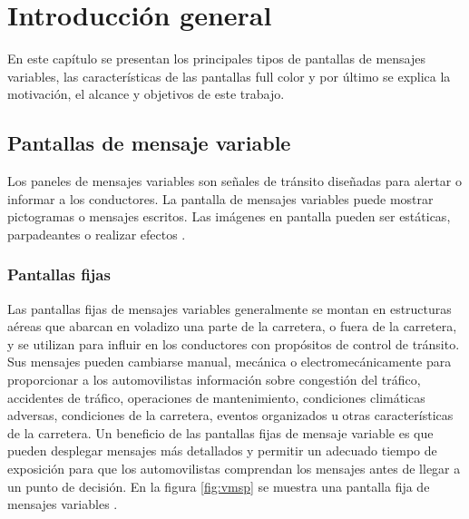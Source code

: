 
\chapter{Introducción general} %

\label{Chapter1} %
\label{IntroGeneral}
En este capítulo se presentan los principales tipos de pantallas de mensajes variables, las características de las pantallas full color y por último se explica la motivación, el alcance y objetivos de este trabajo.

\newcommand{\keyword}[1]{\textbf{#1}}
\newcommand{\tabhead}[1]{\textbf{#1}}
\newcommand{\code}[1]{\texttt{#1}}
\newcommand{\file}[1]{\texttt{\bfseries#1}}
\newcommand{\option}[1]{\texttt{\itshape#1}}
\newcommand{\grados}{$^{\circ}$}



\section{Pantallas de mensaje variable}

Los paneles de mensajes variables son señales de tránsito diseñadas para alertar o informar a los conductores. La pantalla de mensajes variables puede mostrar pictogramas o mensajes escritos. Las imágenes en pantalla pueden ser estáticas, parpadeantes o realizar efectos \cite{WIKIVMS}.


\subsection{Pantallas fijas}

Las pantallas fijas de mensajes variables generalmente se montan en estructuras aéreas que abarcan en voladizo una parte de la carretera, o fuera de la carretera, y se utilizan para influir en los conductores con propósitos de control de tránsito. Sus mensajes pueden cambiarse manual, mecánica o electromecánicamente para proporcionar a los automovilistas información sobre congestión del tráfico, accidentes de tráfico, operaciones de mantenimiento, condiciones climáticas adversas, condiciones de la carretera, eventos organizados u otras características de la carretera. Un beneficio de las pantallas fijas de mensaje variable es que pueden desplegar mensajes más detallados y permitir un adecuado tiempo de exposición  para que los automovilistas comprendan los mensajes antes de llegar a un punto de decisión. En la figura \ref{fig:vmsp} se muestra una pantalla fija de mensajes variables \citep{VMSTYPES}.



